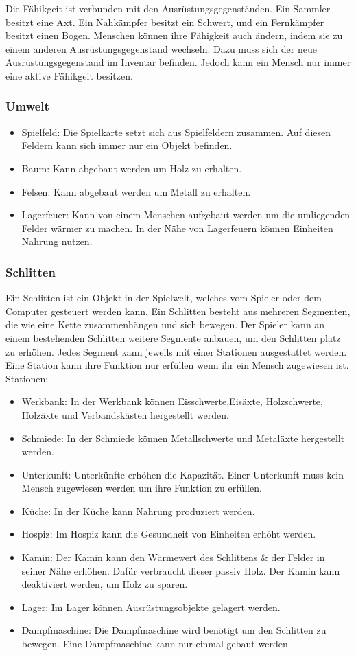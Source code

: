 \documentclass[a4paper,
  twoside, %
  headlines=2.1 %
  ]{scrartcl}
\begin{document}
			Die Fähikgeit ist verbunden mit den Ausrüstungsgegenständen. Ein Sammler besitzt eine Axt. Ein Nahkämpfer besitzt ein Schwert, und ein Fernkämpfer besitzt einen Bogen. Menschen können ihre Fähigkeit auch ändern, indem sie zu einem anderen Ausrüstungsgegenstand wechseln. Dazu muss sich der neue Ausrüstungsgegenstand im Inventar befinden.  Jedoch kann ein Mensch nur immer eine aktive Fähikgeit besitzen.  
			\subsubsection {Umwelt}
			\begin{itemize}
    			\item Spielfeld: 
    			Die Spielkarte setzt sich aus Spielfeldern zusammen. Auf diesen Feldern kann sich immer nur ein Objekt befinden.
				\item Baum: Kann abgebaut werden um Holz zu erhalten.
				\item Felsen: Kann abgebaut werden um Metall zu erhalten.
				\item Lagerfeuer: Kann von einem Menschen aufgebaut werden um die umliegenden Felder wärmer zu machen. In der Nähe von Lagerfeuern können Einheiten Nahrung nutzen.
    		\end{itemize}
			\subsubsection {Schlitten}
					Ein Schlitten ist ein Objekt in der Spielwelt, welches vom Spieler oder dem Computer gesteuert werden kann. Ein Schlitten besteht aus mehreren Segmenten, die wie eine Kette zusammenhängen und sich bewegen. Der Spieler kann an einem bestehenden Schlitten weitere Segmente anbauen, um den Schlitten platz zu erhöhen. Jedes Segment kann jeweils mit einer Stationen ausgestattet werden. Eine Station kann ihre Funktion nur erfüllen wenn ihr ein Mensch zugewiesen ist.\\
					Stationen:
					\begin{itemize}
					    \item Werkbank: In der Werkbank können Eisschwerte,Eisäxte, Holzschwerte, Holzäxte und Verbandskästen hergestellt werden.
					    \item Schmiede: In der Schmiede können Metallschwerte und Metaläxte hergestellt werden.
					    \item Unterkunft: Unterkünfte erhöhen die Kapazität. Einer Unterkunft muss kein Mensch zugewiesen werden um ihre Funktion zu erfüllen.
					    \item Küche: In der Küche kann Nahrung produziert werden.
					    \item Hospiz: Im Hospiz kann die Gesundheit von Einheiten erhöht werden.
					    \item Kamin: Der Kamin kann den Wärmewert des Schlittens \& der Felder in seiner Nähe erhöhen. Dafür verbraucht dieser passiv Holz. Der Kamin kann deaktiviert werden, um Holz zu sparen.
					    \item Lager: Im Lager können Ausrüstungsobjekte gelagert werden.
					    \item Dampfmaschine: Die Dampfmaschine wird benötigt um den Schlitten zu bewegen. Eine Dampfmaschine kann nur einmal gebaut werden.
					\end{itemize}
\end{document}
